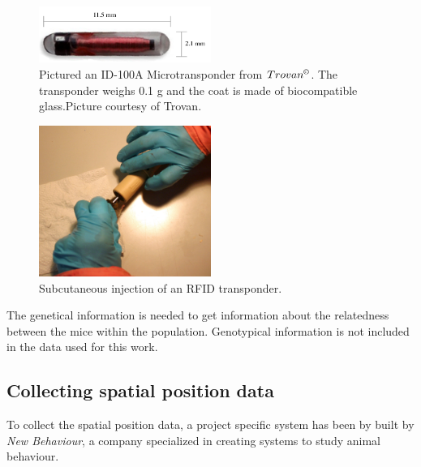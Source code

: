 \begin{figure}[htpb]
\begin{center}
		\includegraphics[width=0.5\textwidth]{assets/pdf/transponder.pdf}
  		\caption[Trovan ID-100A Microtransponder]{Pictured an ID-100A Microtransponder from $Trovan^{\copyright}$. The transponder weighs 0.1 g and the coat is made of biocompatible glass.\newline \small Picture courtesy of Trovan.}
  		\label{fig:transponder}
\end{center}
\end{figure}
\begin{figure}[htpb]
\begin{center}
		\includegraphics[width=0.5\textwidth]{assets/pdf/transponder_inject.pdf}
  		\caption[Injecting an RFID transponder]{Subcutaneous injection of an RFID transponder.}
  		\label{fig:inject_rfid}
\end{center}
\end{figure}

The genetical information is needed to get information about the relatedness between the mice within the population. Genotypical information is not included in the data used for this work.

\subsection{Collecting spatial position data}
\label{subsec:collectspatialpos}

To collect the spatial position data, a project specific system has been by built by \textit{New Behaviour}, a company specialized in creating systems to study animal behaviour. 

